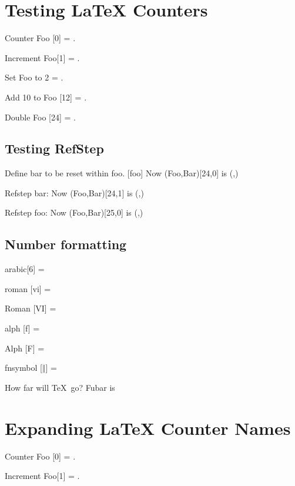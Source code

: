 \documentclass{article}
\begin{document}
\section{Testing LaTeX Counters}
Counter Foo [0] = \thefoo.


Increment Foo[1] =  \thefoo.

\setcounter{foo}{2}
Set Foo to 2 = \thefoo.

\addtocounter{foo}{10}
Add 10 to Foo [12] = \thefoo.


\addtocounter{foo}{\value{foo}}
Double Foo [24] = \thefoo.

\subsection{Testing RefStep}
Define bar to be reset within foo.
[foo]
Now (Foo,Bar)[24,0] is (\thefoo,\thebar)

Refstep bar: 
Now (Foo,Bar)[24,1] is (\thefoo,\thebar)

Refstep foo: 
Now (Foo,Bar)[25,0] is (\thefoo,\thebar)

\subsection{Number formatting}
\setcounter{fubar}{6}
arabic[6] = \thefubar

\renewcommand{\thefubar}{}
roman [vi] = \thefubar


\renewcommand{\thefubar}{}
Roman [VI] = \thefubar

\renewcommand{\thefubar}{}
alph [f] = \thefubar

\renewcommand{\thefubar}{}
Alph [F] = \thefubar

\renewcommand{\thefubar}{}
fnsymbol [$\Vert$] = \thefubar

How far will \TeX\ go?
\renewcommand{\thefubar}{}
\setcounter{fubar}{9999}
Fubar is \thefubar

\section{Expanding LaTeX Counter Names}
\newcommand{\eff}{F}
\newcommand{\oh}{o}
\newcommand{\eww}{oo}
\newcounter{\eff\oh\oh}

Counter Foo [0] = \theFoo.

\stepcounter{\eff\oh\oh}
Increment Foo[1] =  \theFoo.
\end{document}
